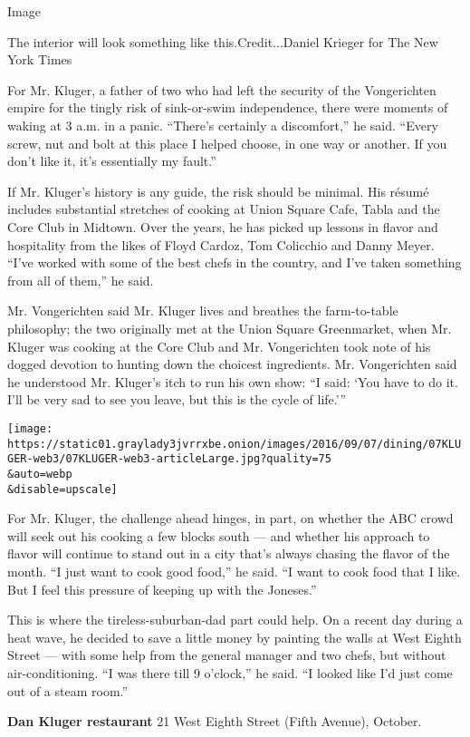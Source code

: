 Image

The interior will look something like this.Credit...Daniel Krieger for
The New York Times

For Mr. Kluger, a father of two who had left the security of the
Vongerichten empire for the tingly risk of sink-or-swim independence,
there were moments of waking at 3 a.m. in a panic. ``There's certainly a
discomfort,'' he said. ``Every screw, nut and bolt at this place I
helped choose, in one way or another. If you don't like it, it's
essentially my fault.''

If Mr. Kluger's history is any guide, the risk should be minimal. His
résumé includes substantial stretches of cooking at Union Square Cafe,
Tabla and the Core Club in Midtown. Over the years, he has picked up
lessons in flavor and hospitality from the likes of Floyd Cardoz, Tom
Colicchio and Danny Meyer. ``I've worked with some of the best chefs in
the country, and I've taken something from all of them,'' he said.

Mr. Vongerichten said Mr. Kluger lives and breathes the farm-to-table
philosophy; the two originally met at the Union Square Greenmarket, when
Mr. Kluger was cooking at the Core Club and Mr. Vongerichten took note
of his dogged devotion to hunting down the choicest ingredients. Mr.
Vongerichten said he understood Mr. Kluger's itch to run his own show:
``I said: `You have to do it. I'll be very sad to see you leave, but
this is the cycle of life.'''

\texttt{[image: https://static01.graylady3jvrrxbe.onion/images/2016/09/07/dining/07KLUGER-web3/07KLUGER-web3-articleLarge.jpg?quality=75\\\&auto=webp\\\&disable=upscale]}

For Mr. Kluger, the challenge ahead hinges, in part, on whether the ABC
crowd will seek out his cooking a few blocks south --- and whether his
approach to flavor will continue to stand out in a city that's always
chasing the flavor of the month. ``I just want to cook good food,'' he
said. ``I want to cook food that I like. But I feel this pressure of
keeping up with the Joneses.''

This is where the tireless-suburban-dad part could help. On a recent day
during a heat wave, he decided to save a little money by painting the
walls at West Eighth Street --- with some help from the general manager
and two chefs, but without air-conditioning. ``I was there till 9
o'clock,'' he said. ``I looked like I'd just come out of a steam room.''

\textbf{Dan Kluger restaurant} 21 West Eighth Street (Fifth Avenue),
October.

